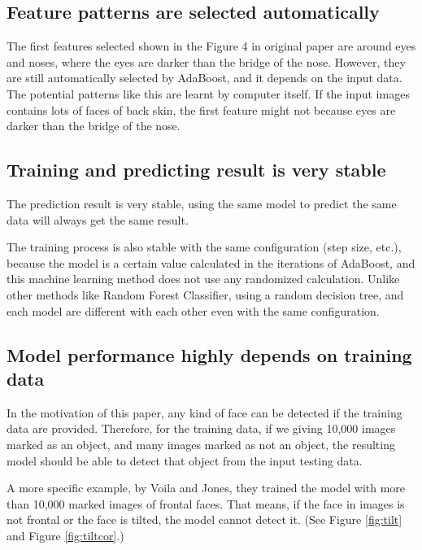 \documentclass[10pt,twocolumn,letterpaper]{article}
\begin{document}
\subsection{Feature patterns are selected automatically}
The first features selected shown in the Figure 4 in original paper are around eyes and noses, where the eyes are darker than the bridge of the nose.
However, they are still automatically selected by AdaBoost, and it depends on the input data. The potential patterns like this are learnt by computer itself.
If the input images contains lots of faces of back skin, the first feature might not because eyes are darker than the bridge of the nose.

\subsection{Training and predicting result is very stable}
The prediction result is very stable, using the same model to predict the same data will always get the same result.

The training process is also stable with the same configuration (step size, etc.),
because the model is a certain value calculated in the iterations of AdaBoost,
and this machine learning method does not use any randomized calculation.
Unlike other methods like Random Forest Classifier, using a random decision tree,
and each model are different with each other even with the same configuration.

\subsection{Model performance highly depends on training data}
In the motivation of this paper, any kind of face can be detected if the training data are provided.
Therefore, for the training data, if we giving 10,000 images marked as an object, and many images marked as not an object,
the resulting model should be able to detect that object from the input testing data.

A more specific example, by Voila and Jones, they trained the model with more than 10,000 marked images of frontal faces.
That means, if the face in images is not frontal or the face is tilted, the model cannot detect it. (See Figure \ref{fig:tilt} and Figure \ref{fig:tiltcor}.)
\end{document}
